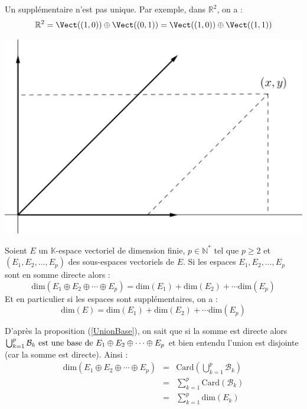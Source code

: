 \documentclass[french,11pt,twoside]{VcCours}
\begin{document}
\medskip

\begin{Remarque}{} 
	\warning{} Un supplémentaire n'est pas unique. 
	Par exemple, dans $\mathbb{R}^2$, on a :
$$ \mathbb{R}^2 = \Vect((1,0)) \oplus \Vect((0,1)) = \Vect((1,0)) \oplus \Vect((1,1))$$

\medskip


\begin{center}
\includegraphics[scale=0.3]{Supp}
\end{center}
\end{Remarque}

\begin{Proposition}{} 
Soient $E$ un $\mathbb{K}$-espace vectoriel de dimension finie, $p \in \mathbb{N}^*$ tel que $p \geq 2$ et $(E_1, E_2, \ldots, E_p)$ des sous-espaces vectoriels de $E$. Si les espaces $E_1, E_2, \ldots, E_p$ sont en somme directe alors :
$$ \textrm{dim}(E_1 \oplus E_2 \oplus \cdots \oplus E_p) =\textrm{dim}(E_1) + \textrm{dim}(E_2) + \cdots \textrm{dim}(E_p)$$
Et en particulier si les espaces sont supplémentaires, on a :
$$ \textrm{dim}(E) = \textrm{dim}(E_1) + \textrm{dim}(E_2) + \cdots \textrm{dim}(E_p)$$
\end{Proposition}

\begin{Demonstration}{} 

D'après la proposition (\ref{UnionBase}), on sait que si la somme est directe alors $\bigcup_{k=1}^p \mathcal{B}_k \hbox{ est une base de } E_1 \oplus E_2 \oplus \cdots \oplus E_p$ et bien entendu l'union est disjointe (car la somme est directe). Ainsi :
$$ \begin{array}{ccl}
\textrm{dim}(E_1 \oplus E_2 \oplus \cdots \oplus E_p) & = & \textrm{Card} \left(\bigcup_{k=1}^p \mathcal{B}_k \right) \\
& = & \sum_{k=1}^p  \textrm{Card}(\mathcal{B}_k) \\
& = & \sum_{k=1}^p \textrm{dim}(E_k) \\
\end{array}$$
\end{Demonstration}
\end{document}
